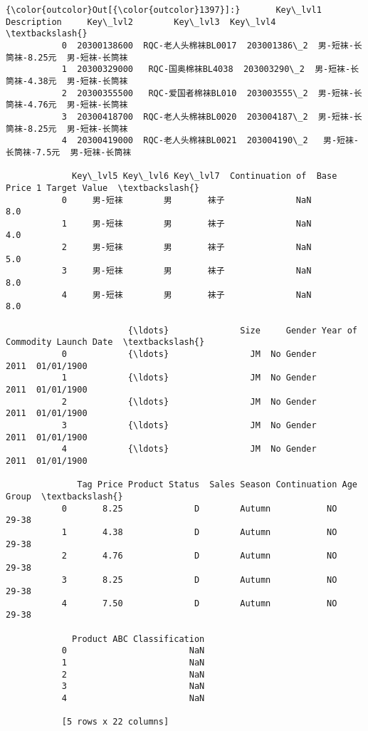 \documentclass[11pt]{article}
\begin{document}
\begin{Verbatim}[commandchars=\\\{\}]
{\color{outcolor}Out[{\color{outcolor}1397}]:}       Key\_lvl1      Description     Key\_lvl2        Key\_lvl3  Key\_lvl4  \textbackslash{}
           0  20300138600  RQC-老人头棉袜BL0017  203001386\_2  男-短袜-长筒袜-8.25元  男-短袜-长筒袜   
           1  20300329000   RQC-国奥棉袜BL4038  203003290\_2  男-短袜-长筒袜-4.38元  男-短袜-长筒袜   
           2  20300355500   RQC-爱国者棉袜BL010  203003555\_2  男-短袜-长筒袜-4.76元  男-短袜-长筒袜   
           3  20300418700  RQC-老人头棉袜BL0020  203004187\_2  男-短袜-长筒袜-8.25元  男-短袜-长筒袜   
           4  20300419000  RQC-老人头棉袜BL0021  203004190\_2   男-短袜-长筒袜-7.5元  男-短袜-长筒袜   
           
             Key\_lvl5 Key\_lvl6 Key\_lvl7  Continuation of  Base Price 1 Target Value  \textbackslash{}
           0     男-短袜        男       袜子              NaN                        8.0   
           1     男-短袜        男       袜子              NaN                        4.0   
           2     男-短袜        男       袜子              NaN                        5.0   
           3     男-短袜        男       袜子              NaN                        8.0   
           4     男-短袜        男       袜子              NaN                        8.0   
           
                        {\ldots}              Size     Gender Year of Commodity Launch Date  \textbackslash{}
           0            {\ldots}                JM  No Gender              2011  01/01/1900   
           1            {\ldots}                JM  No Gender              2011  01/01/1900   
           2            {\ldots}                JM  No Gender              2011  01/01/1900   
           3            {\ldots}                JM  No Gender              2011  01/01/1900   
           4            {\ldots}                JM  No Gender              2011  01/01/1900   
           
              Tag Price Product Status  Sales Season Continuation Age Group  \textbackslash{}
           0       8.25              D        Autumn           NO     29-38   
           1       4.38              D        Autumn           NO     29-38   
           2       4.76              D        Autumn           NO     29-38   
           3       8.25              D        Autumn           NO     29-38   
           4       7.50              D        Autumn           NO     29-38   
           
             Product ABC Classification  
           0                        NaN  
           1                        NaN  
           2                        NaN  
           3                        NaN  
           4                        NaN  
           
           [5 rows x 22 columns]
\end{Verbatim}
            
\end{document}

